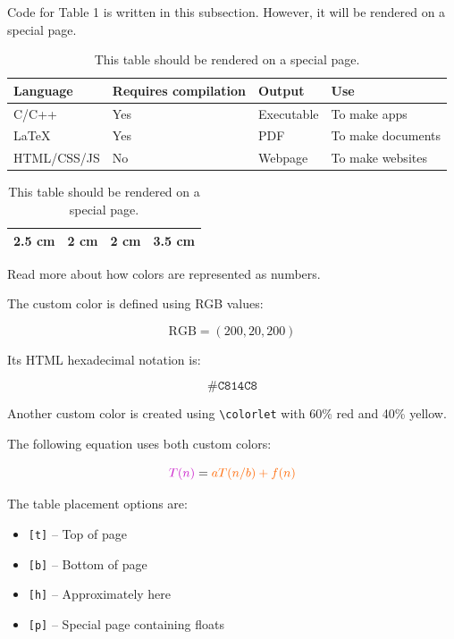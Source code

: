 \documentclass[12pt,a4paper]{article}
\begin{document}
	Code for Table 1 is written in this subsection. However, it will be rendered on a special page.
	
	\begin{table}[p]
		\centering
		\caption{This table should be rendered on a special page.}
		\label{tab:languages}
		
		\renewcommand{\arraystretch}{1.5}
		
		\begin{tabular}{
				|>{\raggedright\arraybackslash}p{2.5cm}
				|>{\centering\arraybackslash}p{2cm}
				|>{\centering\arraybackslash}p{2cm}
				|>{\raggedright\arraybackslash}p{3.5cm}|
			}
			\hline
			\textbf{Language} &
			\textbf{Requires compilation} &
			\textbf{Output} &
			\textbf{Use}\\
			\hline
			C/C++ & Yes & Executable & To make apps\\
			\hline
			\LaTeX & Yes & PDF & To make documents\\
			\hline
			HTML/CSS/JS & No & Webpage & To make websites\\
			\hline
		\end{tabular}
		
		\vspace{5mm}
		
		\begin{tabular}{|c|c|c|c|}
			\hline
			2.5 cm & 2 cm & 2 cm & 3.5 cm\\
			\hline
		\end{tabular}
		
	\end{table}
	
	\clearpage
	
	Read more about how colors are represented as numbers.
	
	The custom color is defined using RGB values:
	
	\[
	\text{RGB}=(200,20,200)
	\]
	
	Its HTML hexadecimal notation is:
	
	\[
	\texttt{\#C814C8}
	\]
	
	Another custom color is created using \verb|\colorlet| with 60\% red and 40\% yellow.
	
	The following equation uses both custom colors:
	
	\[
	\textcolor{custompurple}{T(n)}
	=
	\textcolor{customorange}{aT(n/b)+f(n)}
	\]
	
	The table placement options are:
	
	\begin{itemize}
		\item \texttt{[t]} -- Top of page
		\item \texttt{[b]} -- Bottom of page
		\item \texttt{[h]} -- Approximately here
		\item \texttt{[p]} -- Special page containing floats
	\end{itemize}
	
\end{document}
